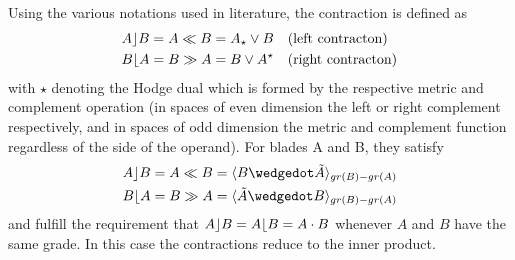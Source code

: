 Using the various notations used in literature, the contraction is defined as
\begin{subequations}
    \begin{align}
    A \rfloor B & = A \ll B = A_{\star} \vee B \quad \textrm{(left contracton)}
    \label{eq:lcontr} \\
    B \lfloor A & = B \gg A = B \vee A^{\star} \quad \textrm{(right contracton)}
    \label{eq:rcontr}
    \end{align}
\end{subequations}
with $\star$ denoting the Hodge dual which is formed by the respective metric and
complement operation (in spaces of even dimension the left or right complement
respectively, and in spaces of odd dimension the metric and complement function regardless
of the side of the operand). For blades A and B, they satisfy
\begin{subequations}
    \begin{align}
    A \lcontr B &  = A \ll B = \grprj{B \wedgedot \tilde{A}}{gr(B)-gr(A)}
    \label{eq:lcontr_gpr} \\
    B \rcontr A & = B \gg A = \grprj{\tilde{A} \wedgedot B}{gr(B)-gr(A)}
    \label{eq:rcontr_gpr}
    \end{align}
\end{subequations}
and fulfill the requirement that $A \rfloor B = A \lfloor B = A \cdot B$ whenever $A$
and $B$ have the same grade. In this case the contractions reduce to the inner product. \\


